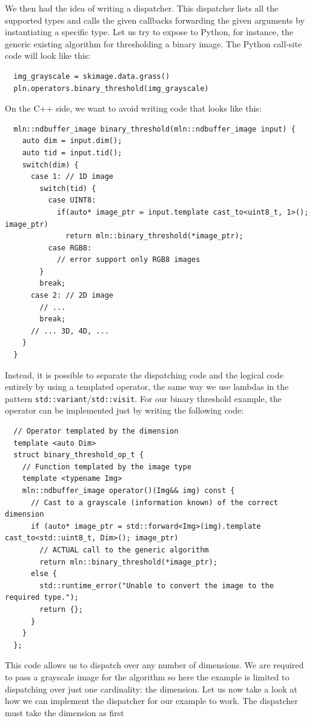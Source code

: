 We then had the idea of writing a dispatcher. This dispatcher lists all the supported types and calls the given
callbacks forwarding the given arguments by instantiating a specific type. Let us try to expose to Python, for instance,
the generic existing algorithm for thresholding a binary image. The Python call-site code will look like this:
\begin{verbatim}
  img_grayscale = skimage.data.grass()
  pln.operators.binary_threshold(img_grayscale)
\end{verbatim}
On the C++ side, we want to avoid writing code that looks like this:
\begin{verbatim}
  mln::ndbuffer_image binary_threshold(mln::ndbuffer_image input) {
    auto dim = input.dim();
    auto tid = input.tid();
    switch(dim) {
      case 1: // 1D image
        switch(tid) {
          case UINT8:
            if(auto* image_ptr = input.template cast_to<uint8_t, 1>(); image_ptr)
              return mln::binary_threshold(*image_ptr);
          case RGB8:
            // error support only RGB8 images
        }
        break;
      case 2: // 2D image
        // ...
        break;
      // ... 3D, 4D, ...
    }
  }
\end{verbatim}
Instead, it is possible to separate the dispatching code and the logical code entirely by using a templated operator,
the same way we use lambdas in the pattern \texttt{std::variant}/\texttt{std::visit}. For our binary threshold example,
the operator can be implemented just by writing the following code:
\begin{verbatim}
  // Operator templated by the dimension
  template <auto Dim>
  struct binary_threshold_op_t {
    // Function templated by the image type
    template <typename Img>
    mln::ndbuffer_image operator()(Img&& img) const {
      // Cast to a grayscale (information known) of the correct dimension
      if (auto* image_ptr = std::forward<Img>(img).template cast_to<std::uint8_t, Dim>(); image_ptr)
        // ACTUAL call to the generic algorithm
        return mln::binary_threshold(*image_ptr);
      else {
        std::runtime_error("Unable to convert the image to the required type.");
        return {};
      }
    }
  };
\end{verbatim}
This code allows us to dispatch over any number of dimensions. We are required to pass a grayscale image for the
algorithm so here the example is limited to dispatching over just one cardinality: the dimension. Let us now take a look
at how we can implement the dispatcher for our example to work. The dispatcher must take the dimension as first
